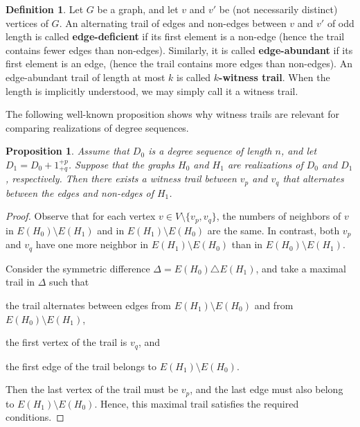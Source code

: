 \documentclass[11pt]{elsarticle}
\theoremstyle{plain}
\newtheorem{proposition}[theorem]{Proposition}
\theoremstyle{definition}
\newtheorem{definition}[theorem]{Definition}
\begin{document}
\begin{definition}\label{df:spec-trails}
    Let $G$ be a graph, and let $v$ and $v'$ be  (not necessarily distinct) vertices of $G$. An alternating trail of edges and non-edges between $v$ and $v'$ of  odd length is called \textbf{edge-deficient} if
    its first element  is a non-edge (hence the trail contains fewer edges than non-edges). Similarly,   it is called \textbf{edge-abundant} if
    its first element  is an edge, (hence  the trail contains more edges than non-edges). An edge-abundant trail of length at most $k$ is called \textbf{$k$-witness trail}. When the length is implicitly understood, we may simply call it a witness trail.
\end{definition}

The following well-known proposition shows why witness trails are relevant for comparing realizations of degree sequences.


\begin{proposition}\label{pr:find_trail}
    Assume that $D_0$ is a degree sequence of length $n$, and let $D_1 = D_0 + 1^{+p}_{+q}$.
    Suppose that the graphs $H_0$ and $H_1$ are realizations of $D_0$ and $D_1$, respectively.
    Then there exists a witness trail between $v_p$ and $v_q$ that alternates between the edges and non-edges of $H_1$.
    \end{proposition}

    \begin{proof}
    Observe that for each vertex $v \in V \setminus \{v_p, v_q\}$, the numbers of neighbors of $v$ in $E(H_0) \setminus E(H_1)$ and in $E(H_1) \setminus E(H_0)$ are the same.
    In contrast, both $v_p$ and $v_q$ have one more neighbor in $E(H_1) \setminus E(H_0)$ than in $E(H_0) \setminus E(H_1)$.

    Consider the symmetric difference $\Delta = E(H_0) \triangle E(H_1)$, and take a maximal trail in $\Delta$ such that
    \begin{inparaenum}[(i)]
    \item the trail alternates between edges from $E(H_1) \setminus E(H_0)$ and from $E(H_0) \setminus E(H_1)$,
    \item the first vertex of the trail is $v_q$, and
    \item the first edge of the trail belongs to $E(H_1) \setminus E(H_0)$.
    \end{inparaenum}
    Then the last vertex of the trail must be $v_p$, and the last edge must also belong to $E(H_1) \setminus E(H_0)$.
    Hence, this maximal trail satisfies the required conditions.
    \end{proof}
\end{document}
